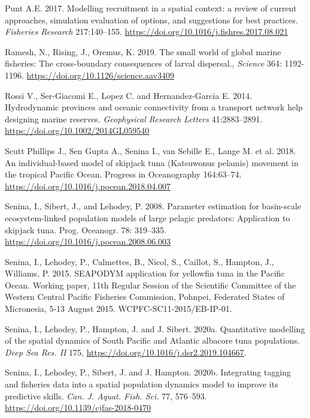 \begin{thebibliography}{}
 Punt A.E. 2017. Modelling recruitment in a spatial context: a review of current approaches, simulation evaluation of options, and suggestions for best practices. \textit {Fisheries Research} 217:140–155. \url{https://doi.org/10.1016/j.fishres.2017.08.021}

 Ramesh, N., Rising, J., Oremus, K. 2019. 
The small world of global marine fisheries: The cross-boundary consequences of larval dispersal., \textit {Science} 364: 1192-1196. \url{https://doi.org/10.1126/science.aav3409}

 Rossi V., Ser-Giacomi E., Lopez C. and Hernandez-Garcia E. 2014. Hydrodynamic provinces and oceanic connectivity from a transport network help designing marine reserves. \textit{Geophysical Research Letters} 41:2883–2891. \url{https://doi.org/10.1002/2014GL059540}

 Scutt Phillips J., Sen Gupta A., Senina I., van Sebille E., Lange M. et al. 2018. An individual-based model of skipjack tuna (Katsuwonus pelamis) movement in the tropical Pacific Ocean. Progress in Oceanography 164:63–74. \url{https://doi.org/10.1016/j.pocean.2018.04.007}

 Senina, I., Sibert, J., and Lehodey, P. 2008. Parameter estimation for basin-scale ecosystem-linked population models of large pelagic predators: Application to skipjack tuna. Prog. Oceanogr. 78: 319–335. \url{https://doi.org/10.1016/j.pocean.2008.06.003}

 Senina, I., Lehodey, P., Calmettes, B., Nicol, S., Caillot, S., Hampton, J., Williams, P. 2015. SEAPODYM application for yellowfin tuna in the Pacific Ocean. Working paper, 11th Regular Session of the Scientific Committee of the Western Central Pacific Fisheries Commission, Pohnpei, Federated States of Micronesia, 5-13 August 2015. WCPFC-SC11-2015/EB-IP-01.

 Senina, I., Lehodey, P., Hampton, J. and J. Sibert. 2020a. Quantitative modelling of the spatial dynamics of South Pacific and Atlantic albacore tuna populations. \textit{Deep Sea Res. II}  175,  \url{https://doi.org/10.1016/j.dsr2.2019.104667}.  

 Senina, I., Lehodey, P., Sibert, J. and J. Hampton. 2020b. Integrating tagging and fisheries data into a spatial population dynamics model to improve its predictive skills. \textit {Can. J. Aquat. Fish. Sci.} 77, 576–593. \url{https://doi.org/10.1139/cjfas-2018-0470}


\end{thebibliography}
